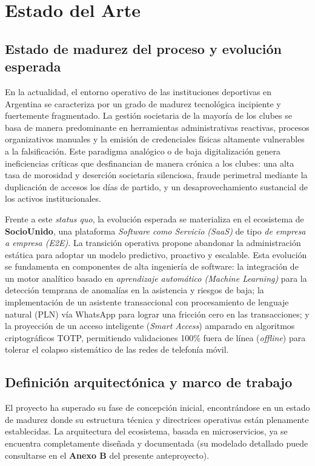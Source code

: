\section{Estado del Arte}

\subsection{Estado de madurez del proceso y evolución esperada}

En la actualidad, el entorno operativo de las instituciones deportivas en Argentina se caracteriza por un grado de madurez tecnológica incipiente y fuertemente fragmentado. La gestión societaria de la mayoría de los clubes se basa de manera predominante en herramientas administrativas reactivas, procesos organizativos manuales y la emisión de credenciales físicas altamente vulnerables a la falsificación. Este paradigma analógico o de baja digitalización genera ineficiencias críticas que desfinancian de manera crónica a los clubes: una alta tasa de morosidad y deserción societaria silenciosa, fraude perimetral mediante la duplicación de accesos los días de partido, y un desaprovechamiento sustancial de los activos institucionales.

Frente a este \textit{status quo}, la evolución esperada se materializa en el ecosistema de \textbf{SocioUnido}, una plataforma \textit{Software como Servicio (SaaS)} de tipo \textit{de empresa a empresa (E2E)}. La transición operativa propone abandonar la administración estática para adoptar un modelo predictivo, proactivo y escalable. Esta evolución se fundamenta en componentes de alta ingeniería de software: la integración de un motor analítico basado en \textit{aprendizaje automático (Machine Learning)} para la detección temprana de anomalías en la asistencia y riesgos de baja; la implementación de un asistente transaccional con procesamiento de lenguaje natural (PLN) vía WhatsApp para lograr una fricción cero en las transacciones; y la proyección de un acceso inteligente (\textit{Smart Access}) amparado en algoritmos criptográficos TOTP, permitiendo validaciones 100\% fuera de línea (\textit{offline}) para tolerar el colapso sistemático de las redes de telefonía móvil.

\subsection{Definición arquitectónica y marco de trabajo}

El proyecto ha superado su fase de concepción inicial, encontrándose en un estado de madurez donde su estructura técnica y directrices operativas están plenamente establecidas. La arquitectura del ecosistema, basada en microservicios, ya se encuentra completamente diseñada y documentada (su modelado detallado puede consultarse en el \textbf{Anexo B} del presente anteproyecto).

